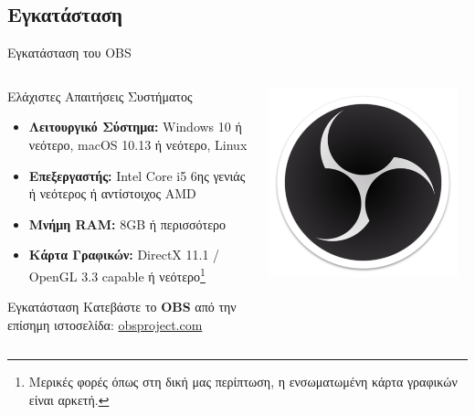 \documentclass[aspectratio=169]{beamer}
\begin{document}
\subsection{Εγκατάσταση}
\begin{frame}{Εγκατάσταση του OBS}
  \begin{columns}
    \begin{column}{0.8\textwidth}
      \begin{block}{Ελάχιστες Απαιτήσεις Συστήματος}
        \begin{itemize}
          \item \textbf{Λειτουργικό Σύστημα:} Windows 10 ή νεότερο, macOS 10.13 ή νεότερο, Linux
          \item \textbf{Επεξεργαστής:} Intel Core i5 6ης γενιάς ή νεότερος ή αντίστοιχος AMD
          \item \textbf{Μνήμη RAM:} 8GB ή περισσότερο
          \item \textbf{Κάρτα Γραφικών:} DirectX 11.1 / OpenGL 3.3 capable ή νεότερο\footnote{Μερικές φορές όπως στη δική μας περίπτωση, η ενσωματωμένη κάρτα γραφικών είναι αρκετή.}
        \end{itemize}
      \end{block}
      \begin{block}{Εγκατάσταση}
        Κατεβάστε το \textbf{OBS} από την επίσημη ιστοσελίδα: \href{https://obsproject.com/}{obsproject.com}
      \end{block}
    \end{column}
    \begin{column}{0.2\textwidth}
      \begin{center}
        \includegraphics[width=0.95\textwidth]{images/obs2.png}
      \end{center}
    \end{column}
  \end{columns}
\end{frame}
\end{document}

